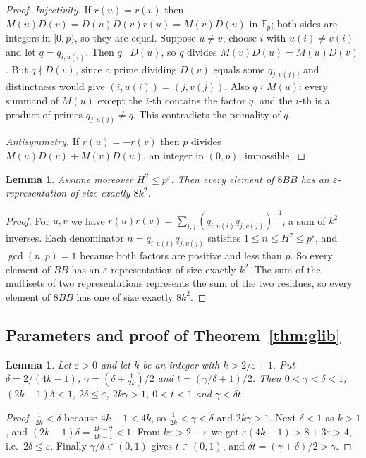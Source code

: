 \documentclass[11pt]{amsart}
\theoremstyle{plain}
\newtheorem{lemma}[theorem]{Lemma}
\theoremstyle{definition}
\newcommand{\F}{\mathbb{F}_p}
\newcommand{\eps}{\varepsilon}
\begin{document}
{\begin{proof}
\emph{Injectivity.} If $r(u)=r(v)$ then $M(u)D(v)=D(u)D(v)r(u)=M(v)D(u)$ in $\F$; both sides are integers in $[0,p)$, so they are equal. Suppose $u\ne v$, choose $i$ with $u(i)\ne v(i)$ and let $q=q_{i,u(i)}$. Then $q\mid D(u)$, so $q$ divides $M(v)D(u)=M(u)D(v)$. But $q\nmid D(v)$, since a prime dividing $D(v)$ equals some $q_{j,v(j)}$, and distinctness would give $(i,u(i))=(j,v(j))$. Also $q\nmid M(u)$: every summand of $M(u)$ except the $i$-th contains the factor $q$, and the $i$-th is a product of primes $q_{j,u(j)}\ne q$. This contradicts the primality of $q$.

\emph{Antisymmetry.} If $r(u)=-r(v)$ then $p$ divides $M(u)D(v)+M(v)D(u)$, an integer in $(0,p)$; impossible.
\end{proof}

\begin{lemma}\label{lem:exact}
Assume moreover $H^2\le p^\eps$. Then every element of $8BB$ has an $\eps$-representation of size exactly $8k^2$.
\end{lemma}

\begin{proof}
For $u,v$ we have $r(u)r(v)=\sum_{i,j}(q_{i,u(i)}q_{j,v(j)})^{-1}$, a sum of $k^2$ inverses. Each denominator $n=q_{i,u(i)}q_{j,v(j)}$ satisfies $1\le n\le H^2\le p^\eps$, and $\gcd(n,p)=1$ because both factors are positive and less than $p$. So every element of $BB$ has an $\eps$-representation of size exactly $k^2$. The sum of the multisets of two representations represents the sum of the two residues, so every element of $8BB$ has one of size exactly $8k^2$.
\end{proof}

\subsection{Parameters and proof of Theorem~\ref{thm:glib}}\label{sec:params}

\begin{lemma}\label{lem:params}
Let $\eps>0$ and let $k$ be an integer with $k>2/\eps+1$. Put $\delta=2/(4k-1)$, $\gamma=(\delta+\frac1{2k})/2$ and $t=(\gamma/\delta+1)/2$. Then $0<\gamma<\delta<1$, $(2k-1)\delta<1$, $2\delta\le\eps$, $2k\gamma>1$, $0<t<1$ and $\gamma<\delta t$.
\end{lemma}

\begin{proof}
$\frac1{2k}<\delta$ because $4k-1<4k$, so $\frac1{2k}<\gamma<\delta$ and $2k\gamma>1$. Next $\delta<1$ as $k>1$, and $(2k-1)\delta=\frac{4k-2}{4k-1}<1$. From $k\eps>2+\eps$ we get $\eps(4k-1)>8+3\eps>4$, i.e.\ $2\delta\le\eps$. Finally $\gamma/\delta\in(0,1)$ gives $t\in(0,1)$, and $\delta t=(\gamma+\delta)/2>\gamma$.
\end{proof}

}
\end{document}
